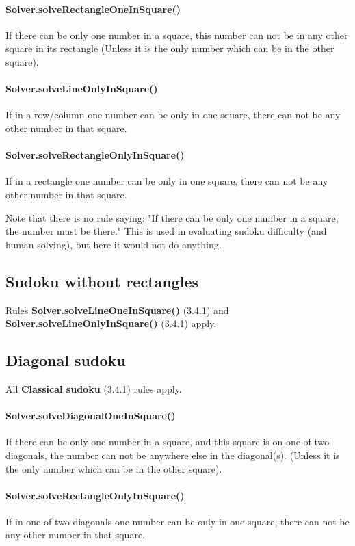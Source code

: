 \documentclass{report}
\begin{document}
\paragraph{Solver.solveRectangleOneInSquare()}
If there can be only one number in a square, this number can not be in any other square in its rectangle (Unless it is the only number which can be in the other square).

\paragraph{Solver.solveLineOnlyInSquare()}
If in a row/column one number can be only in one square, there can not be any other number in that square.

\paragraph{Solver.solveRectangleOnlyInSquare()}
If in a rectangle one number can be only in one square, there can not be any other number in that square.

Note that there is no rule saying: "If there can be only one number in a square, the number must be there." This is used in evaluating sudoku difficulty (and human solving), but here it would not do anything.

\subsection{Sudoku without rectangles}

Rules \textbf{Solver.solveLineOneInSquare()} (3.4.1) and \textbf{Solver.solveLineOnlyInSquare()} (3.4.1) apply.

\subsection{Diagonal sudoku}

All \textbf{Classical sudoku} (3.4.1) rules apply.

\paragraph{Solver.solveDiagonalOneInSquare()}
If there can be only one number in a square, and this square is on one of two diagonals, the number can not be anywhere else in the diagonal(s). (Unless it is the only number which can be in the other square).

\paragraph{Solver.solveRectangleOnlyInSquare()}
If in one of two diagonals one number can be only in one square, there can not be any other number in that square.
\end{document}
